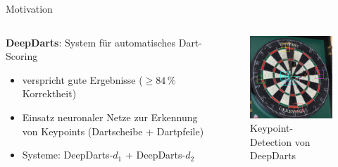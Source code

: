 \begin{frame}{Motivation}

    \begin{columns}
        \begin{column}{0.6\linewidth}

            \textbf{DeepDarts}: System für automatisches Dart-Scoring
            \begin{itemize}
                \item verspricht gute Ergebnisse ($\geq 84\,\%$ Korrektheit)
                \item Einsatz neuronaler Netze zur Erkennung von Keypoints (Dartscheibe + Dartpfeile)
                \item Systeme: DeepDarts-$d_1$ + DeepDarts-$d_2$
            \end{itemize}

        \end{column}
        \begin{column}{0.4\linewidth}

            \begin{figure}
                \centering
                \includegraphics[width=0.8\linewidth]{imgs/dd_keypoints.pdf}
                \vspace*{-0.2cm}
                \caption{Keypoint-Detection von DeepDarts}
            \end{figure}

        \end{column}
    \end{columns}

    \vspace*{-0.2cm}


\end{frame}

